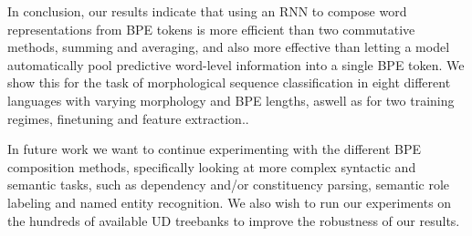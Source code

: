 \documentclass[11pt]{article}
\begin{document}
            In conclusion, our results indicate that using an RNN to
     compose word representations from BPE tokens is more efficient
     than two commutative methods, summing and averaging, and also
     more effective than letting a model automatically pool predictive
     word-level information into a single BPE token.
    We show this for the task of morphological sequence classification in 
     eight different languages with varying morphology and BPE
     lengths, aswell as for two training regimes, finetuning and
     feature extraction..
     
    In future work we want to continue experimenting with the different
    BPE composition methods, specifically looking at more complex
    syntactic and semantic tasks, such as dependency and/or
    constituency parsing, semantic role labeling and named entity recognition. 
        We also wish to run our experiments on the hundreds
     of available UD treebanks to improve the robustness of our
     results.  
    

	
	
	
\end{document}
